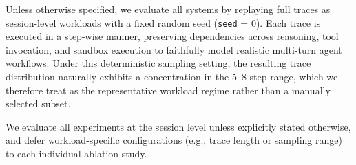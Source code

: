 

Unless otherwise specified, we evaluate all systems by replaying full traces as session-level workloads with a fixed random seed (\texttt{seed} = 0). Each trace is executed in a step-wise manner, preserving dependencies across reasoning, tool invocation, and sandbox execution to faithfully model realistic multi-turn agent workflows. Under this deterministic sampling setting, the resulting trace distribution naturally exhibits a concentration in the 5--8 step range, which we therefore treat as the representative workload regime rather than a manually selected subset.

We evaluate all experiments at the session level unless explicitly stated otherwise, and defer workload-specific configurations (e.g., trace length or sampling range) to each individual ablation study.

